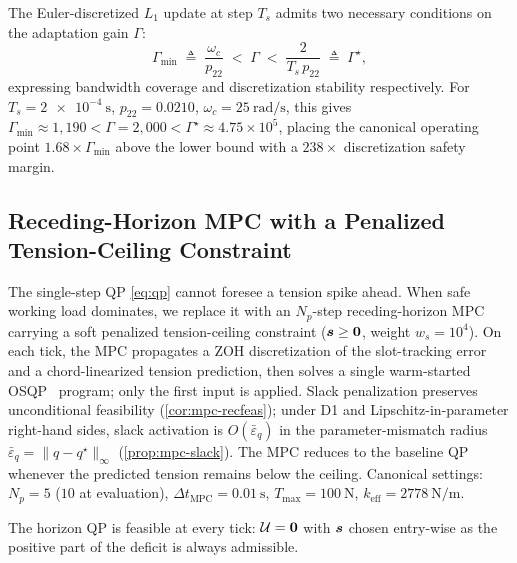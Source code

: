 \begin{proposition}
\label{prop:gamma-star}
The Euler-discretized $L_1$ update at step $T_s$ admits two necessary conditions on the adaptation gain $\Gamma$:
\begin{equation}
  \Gamma_{\min} \;\triangleq\; \frac{\omega_c}{p_{22}}
   \;<\; \Gamma \;<\;
   \frac{2}{T_s\,p_{22}} \;\triangleq\; \Gamma^\star,
   \label{eq:gamma-window}
\end{equation}
expressing bandwidth coverage and discretization stability respectively. For $T_s=\SI{2e-4}{\second}$, $p_{22}=0.0210$, $\omega_c=\SI{25}{\radian\per\second}$, this gives $\Gamma_{\min}\approx 1{,}190 < \Gamma=2{,}000 < \Gamma^\star\approx 4.75\times 10^5$, placing the canonical operating point $1.68\times\Gamma_{\min}$ above the lower bound with a $238\times$ discretization safety margin.
\end{proposition}

\subsection{Receding-Horizon MPC with a Penalized Tension-Ceiling Constraint}
\label{sec:mpc-layer}

The single-step QP \eqref{eq:qp} cannot foresee a tension spike ahead. When safe working load dominates, we replace it with an $N_p$-step receding-horizon MPC carrying a soft penalized tension-ceiling constraint ($\boldsymbol{s}\ge\boldsymbol{0}$, weight $w_s=10^4$). On each tick, the MPC propagates a ZOH discretization of the slot-tracking error and a chord-linearized tension prediction, then solves a single warm-started OSQP~\cite{stellato2020osqp} program; only the first input is applied. Slack penalization preserves unconditional feasibility (\cref{cor:mpc-recfeas}); under D1 and Lipschitz-in-parameter right-hand sides, slack activation is $O(\bar\varepsilon_q)$ in the parameter-mismatch radius $\bar\varepsilon_q=\|q-q^\star\|_\infty$ (\cref{prop:mpc-slack}). The MPC reduces to the baseline QP whenever the predicted tension remains below the ceiling. Canonical settings: $N_p=5$ ($10$ at evaluation), $\Delta t_{\mathrm{MPC}}=\SI{0.01}{\second}$, $T_{\max}=\SI{100}{\newton}$, $k_{\mathrm{eff}}=\SI{2778}{\newton\per\metre}$.

\begin{corollary}
\label{cor:mpc-recfeas}
The horizon QP is feasible at every tick: $\mathcal{U}=\boldsymbol{0}$ with $\boldsymbol{s}$ chosen entry-wise as the positive part of the deficit is always admissible.
\end{corollary}

